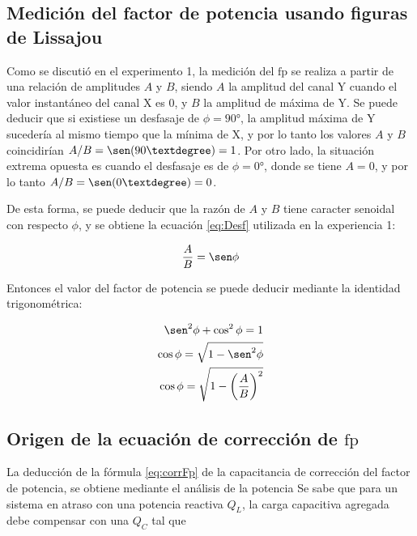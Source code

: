 
\label{sec:conc}

\subsection{Medición del factor de potencia usando figuras de Lissajou}

Como se discutió en el experimento 1, la medición del $\mathrm{fp}$ se realiza a partir de una relación de amplitudes $A$ y $B$, siendo $A$ la amplitud del canal Y cuando el valor instantáneo del canal X es 0, y $B$ la amplitud de máxima de Y.
Se puede deducir que si existiese un desfasaje de $\phi = 90°$, la amplitud máxima de Y sucedería al mismo tiempo que la mínima de X, y por lo tanto los valores $A$ y $B$ coincidirían $A/B=\sen(90°) = 1$. Por otro lado, la situación extrema opuesta es cuando el desfasaje es de $\phi=0°$, donde se tiene $A=0$, y por lo tanto $A/B = \sen(0°) = 0$.

De esta forma, se puede deducir que la razón de $A$ y $B$ tiene caracter senoidal con respecto $\phi$, y se obtiene la ecuación \ref{eq:Desf} utilizada en la experiencia 1:

\begin{equation*}
    \frac{A}{B} = \sen\phi
\end{equation*}

Entonces el valor del factor de potencia se puede deducir mediante la identidad trigonométrica:

\begin{equation*}
    \begin{aligned}
        \sen^2\phi + \cos^2\phi = 1 \\
        \cos\phi = \sqrt{1-\sen^2\phi}\\
        \cos\phi = \sqrt{1-{\left( \frac{A}{B}\right)}^2}
    \end{aligned}
\end{equation*}



\subsection{Origen de la ecuación de corrección de $\mathrm{fp}$}

La deducción de la fórmula \ref{eq:corrFp} 
de la capacitancia de corrección del factor 
de potencia, se obtiene mediante el análisis
 de la potencia 
Se sabe que para un sistema en atraso con 
una potencia reactiva $Q_L$, la carga capacitiva agregada
debe compensar con una $Q_C$ tal que

